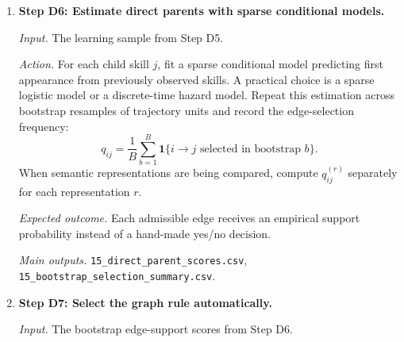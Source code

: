 \begin{enumerate}
    \textit{Input.} The trajectory table from Step D1 and the precedence table from Step D4.

    \textit{Action.} For each child skill $j$, each trajectory $u$, and each year $y$, define:
    \[
    Y_{u,y,j}
    =
    \mathbf{1}\{\text{skill } j \text{ first appears in year } y+1\},
    \]
    and for each candidate parent skill $i$:
    \[
    X_{u,y,i}
    =
    \mathbf{1}\{\text{skill } i \text{ has appeared by year } y\}.
    \]
    Restrict candidate parents to skills that are temporally admissible for $j$.
    If semantic information is used in the directed branch, estimate parallel candidate sets under
    each representation
    \[
    r \in \{\texttt{name\_only}, \texttt{concat}\}.
    \]

    \textit{Expected outcome.} Each child skill receives a tractable prediction sample for
    estimating its direct parents rather than all earlier skills indiscriminately.

    \textit{Main outputs.}
    \texttt{14\_dependency\_learning\_sample.csv},
    \texttt{14\_candidate\_parent\_sets.csv}.

    \item \textbf{Step D6: Estimate direct parents with sparse conditional models.}

    \textit{Input.} The learning sample from Step D5.

    \textit{Action.} For each child skill $j$, fit a sparse conditional model predicting first
    appearance from previously observed skills. A practical choice is a sparse logistic model or
    a discrete-time hazard model. Repeat this estimation across bootstrap resamples of trajectory
    units and record the edge-selection frequency:
    \[
    q_{ij}
    =
    \frac{1}{B}
    \sum_{b=1}^{B}
    \mathbf{1}\{i \rightarrow j \text{ selected in bootstrap } b\}.
    \]
    When semantic representations are being compared, compute $q_{ij}^{(r)}$ separately for each
    representation $r$.

    \textit{Expected outcome.} Each admissible edge receives an empirical support probability
    instead of a hand-made yes/no decision.

    \textit{Main outputs.}
    \texttt{15\_direct\_parent\_scores.csv},
    \texttt{15\_bootstrap\_selection\_summary.csv}.

    \item \textbf{Step D7: Select the graph rule automatically.}

    \textit{Input.} The bootstrap edge-support scores from Step D6.


\end{enumerate}
